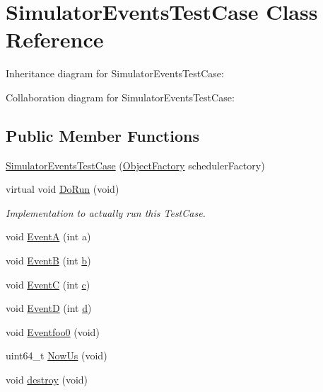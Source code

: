\hypertarget{classSimulatorEventsTestCase}{}\section{Simulator\+Events\+Test\+Case Class Reference}
\label{classSimulatorEventsTestCase}


Inheritance diagram for Simulator\+Events\+Test\+Case\+:


Collaboration diagram for Simulator\+Events\+Test\+Case\+:
\subsection*{Public Member Functions}
\begin{DoxyCompactItemize}
\item 
\hyperlink{classSimulatorEventsTestCase_a629a32a3e2c5332253230d5f248cad30}{Simulator\+Events\+Test\+Case} (\hyperlink{classns3_1_1ObjectFactory}{Object\+Factory} scheduler\+Factory)
\item 
virtual void \hyperlink{classSimulatorEventsTestCase_a00040d668dfec666439e200cbf653807}{Do\+Run} (void)
\begin{DoxyCompactList}\small\item\em Implementation to actually run this Test\+Case. \end{DoxyCompactList}\item 
void \hyperlink{classSimulatorEventsTestCase_a1c00c3c0ad85145671fe4a5776f4ad62}{EventA} (int a)
\item 
void \hyperlink{classSimulatorEventsTestCase_a6ca4d5ed1b7cd1774aebf0a37b470808}{EventB} (int \hyperlink{lte__pathloss_8m_a21ad0bd836b90d08f4cf640b4c298e7c}{b})
\item 
void \hyperlink{classSimulatorEventsTestCase_a8ea66232dd73ab27acbffc952ddd6d0d}{EventC} (int \hyperlink{mmwave_2model_2fading-traces_2fading__trace__generator_8m_ae0323a9039add2978bf5b49550572c7c}{c})
\item 
void \hyperlink{classSimulatorEventsTestCase_ae1ffeb46df7ee8d5a6e79c3d1b566a3c}{EventD} (int \hyperlink{lte__pathloss_8m_a1aabac6d068eef6a7bad3fdf50a05cc8}{d})
\item 
void \hyperlink{classSimulatorEventsTestCase_ac3aa8ff287e2469750eeaa39676ed53e}{Eventfoo0} (void)
\item 
uint64\+\_\+t \hyperlink{classSimulatorEventsTestCase_a66578dbe2287c1a0841d3ff38f509d6e}{Now\+Us} (void)
\item 
void \hyperlink{classSimulatorEventsTestCase_a1ccb189e5b14b7d42e5641e575fee4a2}{destroy} (void)
\end{DoxyCompactItemize}
